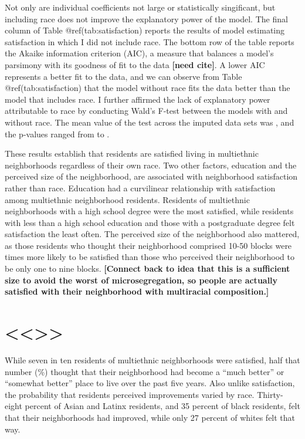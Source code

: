 \documentclass{baderart}
\begin{document}
Not only are individual coefficients not large or statistically
singificant, but including race does not improve the explanatory power
of the model. The final column of Table @ref(tab:satisfaction) reports
the results of model estimating satisfaction in which I did not include
race. The bottom row of the table reports the Akaike information
criterion (AIC), a measure that balances a model's parsimony with its
goodness of fit to the data \textbf{{[}need cite{]}}. A lower AIC
represents a better fit to the data, and we can observe from Table
@ref(tab:satisfaction) that the model without race fits the data better
than the model that includes race. I further affirmed the lack of
explanatory power attributable to race by conducting Wald's F-test
between the models with and without race. The mean value of the test
across the imputed data sets was \satWaldF, and the p-values ranged from
\satWaldpMin to \satWaldpMax.

These results establish that residents are satisfied living in
multiethnic neighborhoods regardless of their own race. Two other
factors, education and the perceived size of the neighborhood, are
associated with neighborhood satisfaction rather than race. Education
had a curvilinear relationship with satisfaction among multiethnic
neighborhood residents. Residents of multiethnic neighborhoods with a
high school degree were the most satisfied, while residents with less
than a high school education and those with a postgraduate degree felt
satisfaction the least often. The perceived size of the neighborhood
also mattered, as those residents who thought their neighborhood
comprised 10-50 blocks were \satnhdsize times more likely to be
satisfied than those who perceived their neighborhood to be only one to
nine blocks. \textbf{{[}Connect back to idea that this is a sufficient
size to avoid the worst of microsegregation, so people are actually
satisfied with their neighborhood with multiracial composition.{]}}

\section{\textless{}\textless{}\textgreater{}\textgreater{}}\label{section-2}

While seven in ten residents of multiethnic neighborhoods were
satisfied, half that number (\meanimproved \%) thought that their
neighborhood had become a ``much better'' or ``somewhat better'' place
to live over the past five years. Also unlike satisfaction, the
probability that residents perceived improvements varied by race.
Thirty-eight percent of Asian and Latinx residents, and 35 percent of
black residents, felt that their neighborhoods had improved, while only
27 percent of whites felt that way.
\end{document}
